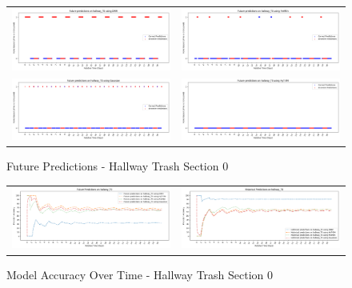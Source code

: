 \begin{figure}
  \begin{tabular}{cc}
    {\includegraphics[width = 3in]{images/results/Future_hallway_T0_DMM.png}} &
    {\includegraphics[width = 3in]{images/results/Future_hallway_T0_FreMEn.png}} \\
    {\includegraphics[width = 3in]{images/results/Future_hallway_T0_Gaussian.png}} &
    {\includegraphics[width = 3in]{images/results/Future_hallway_T0_HyT-EM.png}} \\
  \end{tabular}
  \caption{Future Predictions - Hallway Trash Section 0}
\end{figure}

\begin{figure}
  \begin{tabular}{cc}
    {\includegraphics[width = 3in]{images/results/Future_Predictions_on_hallway_T0.png}} &
    {\includegraphics[width = 3in]{images/results/Historical_Predictions_on_hallway_T0.png}} \\
  \end{tabular}
  \caption{Model Accuracy Over Time - Hallway Trash Section 0}
\end{figure}



